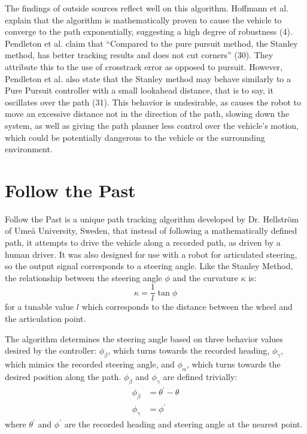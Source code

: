 \documentclass[mla7]{mla}
\begin{document}
\begin{paper}
The findings of outside sources reflect well on this algorithm. Hoffmann et al. explain that the algorithm is mathematically proven to cause the vehicle to converge to the path exponentially, suggesting a high degree of robustness (4). Pendleton et al. claim that ``Compared to the pure pursuit method, the Stanley method, has better tracking results and does not cut corners'' (30). They attribute this to the use of crosstrack error as opposed to pursuit. However, Pendleton et al. also state that the Stanley method may behave similarly to a Pure Pursuit controller with a small lookahead distance, that is to say, it oscillates over the path (31). This behavior is undesirable, as causes the robot to move an excessive distance not in the direction of the path, slowing down the system, as well as giving the path planner less control over the vehicle's motion, which could be potentially dangerous to the vehicle or the surrounding environment.

\section{Follow the Past}

Follow the Past is a unique path tracking algorithm developed by Dr. Hellström of Umeå University, Sweden, that instead of following a mathematically defined path, it attempts to drive the vehicle along a recorded path, as driven by a human driver. It was also designed for use with a robot for articulated steering, so the output signal corresponds to a steering angle. Like the Stanley Method, the relationship between the steering angle $\phi$ and the curvature $\kappa$ is:
\begin{equation}
\kappa=\frac{1}{l}\tan{\phi}
\end{equation}
for a tunable value $l$ which corresponds to the distance between the wheel and the articulation point.

The algorithm determines the steering angle based on three behavior values desired by the controller: $\phi_\beta$, which turns towards the recorded heading, $\phi_\gamma$, which mimics the recorded steering angle, and $\phi_\alpha$, which turns towards the desired position along the path. $\phi_\beta$ and $\phi_\gamma$ are defined trivially:
\begin{subequations}
\begin{align}
\phi_\beta &= \theta^\prime-\theta \\
\phi_\gamma &= \phi^\prime
\end{align}
\end{subequations}
where $\theta^\prime$ and $\phi^\prime$ are the recorded heading and steering angle at the nearest point.


\end{paper}
\end{document}
